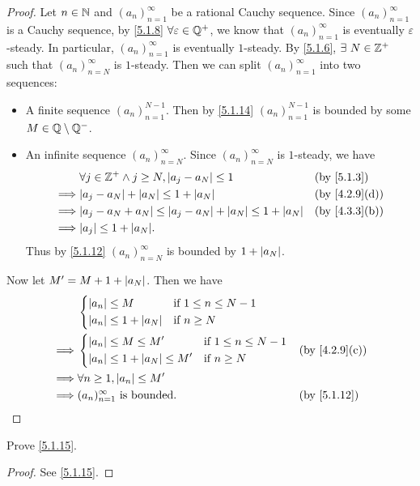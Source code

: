 \begin{proof}
  Let \(n \in \mathbb{N}\) and \((a_n)_{n = 1}^{\infty}\) be a rational Cauchy sequence.
  Since \((a_n)_{n = 1}^{\infty}\) is a Cauchy sequence, by \cref{5.1.8} \(\forall \varepsilon \in \mathbb{Q}^+\), we know that \((a_n)_{n = 1}^{\infty}\) is eventually \(\varepsilon\)-steady.
  In particular, \((a_n)_{n = 1}^{\infty}\) is eventually \(1\)-steady.
  By \cref{5.1.6}, \(\exists\ N \in \Z^+\) such that \((a_n)_{n = N}^{\infty}\) is \(1\)-steady.
  Then we can split \((a_n)_{n = 1}^{\infty}\) into two sequences:
  \begin{itemize}
    \item A finite sequence \((a_n)_{n = 1}^{N - 1}\).
          Then by \cref{5.1.14} \((a_n)_{n = 1}^{N - 1}\) is bounded by some \(M \in \mathbb{Q} \setminus \mathbb{Q}^-\).
    \item An infinite sequence \((a_n)_{n = N}^{\infty}\).
          Since \((a_n)_{n = N}^\infty\) is \(1\)-steady, we have
          \begin{align*}
                     & \forall j \in \Z^+ \land j \geq N, \abs{a_j - a_N} \leq 1                 &  & \by{5.1.3}                  \\
            \implies & \abs{a_j - a_N} + \abs{a_N} \leq 1 + \abs{a_N}                            &  & \text{(by \cref{4.2.9}(d))} \\
            \implies & \abs{a_j - a_N + a_N} \leq \abs{a_j - a_N} + \abs{a_N} \leq 1 + \abs{a_N} &  & \text{(by \cref{4.3.3}(b))} \\
            \implies & \abs{a_j} \leq 1 + \abs{a_N}.
          \end{align*}
          Thus by \cref{5.1.12} \((a_n)_{n = N}^\infty\) is bounded by \(1 + \left\lvert a_N\right\rvert\).
  \end{itemize}
  Now let \(M' = M + 1 + \left\lvert a_N\right\rvert\).
  Then we have
  \begin{align*}
             & \begin{dcases}
                 \abs{a_n} \leq M             & \text{if } 1 \leq n \leq N - 1 \\
                 \abs{a_n} \leq 1 + \abs{a_N} & \text{if } n \geq N
               \end{dcases}                                           \\
    \implies & \begin{dcases}
                 \abs{a_n} \leq M \leq M'             & \text{if } 1 \leq n \leq N - 1 \\
                 \abs{a_n} \leq 1 + \abs{a_N} \leq M' & \text{if } n \geq N
               \end{dcases} &  & \text{(by \cref{4.2.9}(c))}                                   \\
    \implies & \forall n \geq 1, \abs{a_n} \leq M'                                                                     \\
    \implies & (a_n)_{n = 1}^\infty \text{ is bounded}.                                 &  & \text{(by \cref{5.1.12})}
  \end{align*}
\end{proof}

\exercisesection

\begin{ex}\label{ex:5.1.1}
  Prove \cref{5.1.15}.
\end{ex}

\begin{proof}
  See \cref{5.1.15}.
\end{proof}